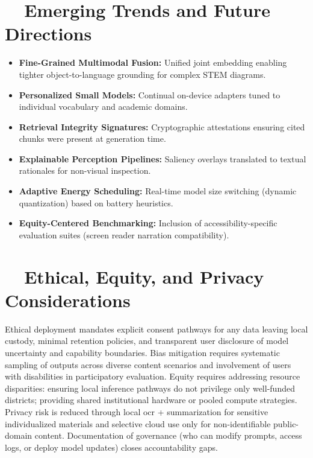 \section{~~Emerging Trends and Future Directions}\label{ch9:sec:emerging-trends}
\begin{itemize}
	\item \textbf{Fine-Grained Multimodal Fusion:} Unified joint embedding enabling tighter object-to-language grounding for complex STEM diagrams.\supercite{aimodels2024}
	\item \textbf{Personalized Small Models:} Continual on-device adapters tuned to individual vocabulary and academic domains.
	\item \textbf{Retrieval Integrity Signatures:} Cryptographic attestations ensuring cited chunks were present at generation time.
	\item \textbf{Explainable Perception Pipelines:} Saliency overlays translated to textual rationales for non-visual inspection.\supercite{AI_Ethics_Bias}
	\item \textbf{Adaptive Energy Scheduling:} Real-time model size switching (dynamic quantization) based on battery heuristics.
	\item \textbf{Equity-Centered Benchmarking:} Inclusion of accessibility-specific evaluation suites (screen reader narration compatibility).
\end{itemize}

\section{~~Ethical, Equity, and Privacy Considerations}\label{ch9:sec:ethics-equity-privacy}
Ethical deployment mandates explicit consent pathways for any data leaving local custody, minimal retention policies, and transparent user disclosure of model uncertainty and capability boundaries.\supercite{DataPrivacyAI} Bias mitigation requires systematic sampling of outputs across diverse content scenarios and involvement of users with disabilities in participatory evaluation.\supercite{AI_Ethics_Bias, Bias_in_AI} Equity requires addressing resource disparities: ensuring local inference pathways do not privilege only well-funded districts; providing shared institutional hardware or pooled compute strategies. Privacy risk is reduced through local \gls{ocr} + summarization for sensitive individualized materials and selective cloud use only for non-identifiable public-domain content. Documentation of governance (who can modify prompts, access logs, or deploy model updates) closes accountability gaps.


